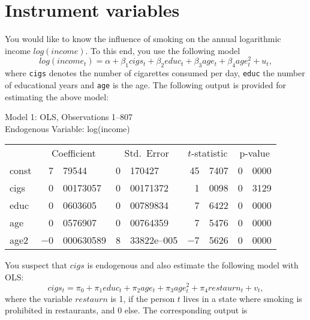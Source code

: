\documentclass{article}
\begin{document}
\newpage
\section{Instrument variables}

You would like to know the influence of smoking on the annual logarithmic income $log(income)$. To this end, you use the following model
\begin{equation}\label{incomecigs}
log(income_t) = \alpha + \beta_1 cigs_t + \beta_2 educ_t + \beta_3 age_t + \beta_4 age_t^2 + u_t,
\end{equation}
where \texttt{cigs} denotes the number of cigarettes consumed per day, \texttt{educ} the number of educational years and \texttt{age} is the age. The following output is provided for estimating the above model:
\begin{footnotesize}
	
	\begin{center}
		
		Model 1: OLS, Observations 1--807\\
		Endogenous Variable: log(income)\\
		
		\vspace{1em}
		\renewcommand{\arraystretch}{0.75}
		\begin{tabular}{lr@{,}lr@{,}lr@{,}lr@{,}l}
			&
			\multicolumn{2}{c}{Coefficient} &
			\multicolumn{2}{c}{Std.\ Error} &
			\multicolumn{2}{c}{$t$-statistic} &
			\multicolumn{2}{c}{p-value} \\[1ex]
			const &
			7&79544 &
			0&170427 &
			45&7407 &
			0&0000 \\
			cigs &
			0&00173057 &
			0&00171372 &
			1&0098 &
			0&3129 \\
			educ &
			0&0603605 &
			0&00789834 &
			7&6422 &
			0&0000 \\
			age &
			0&0576907 &
			0&00764359 &
			7&5476 &
			0&0000 \\
			age2 &
			$-$0&000630589 &
			8&33822\textrm{e--005} &
			$-$7&5626 &
			0&0000 \\
		\end{tabular}
	\end{center}
\end{footnotesize}
You suspect that $cigs$ is endogenous and also estimate the following model with OLS:
\begin{equation*}
cigs_t = \pi_0 + \pi_1 educ_t + \pi_2 age_t + \pi_3 age_t^2 + \pi_4 restaurn_t + v_t,
\end{equation*}
where the variable $restaurn$ is 1, if the person $t$ lives in a state where smoking is prohibited in restaurants, and 0 else. The corresponding output is
\end{document}
